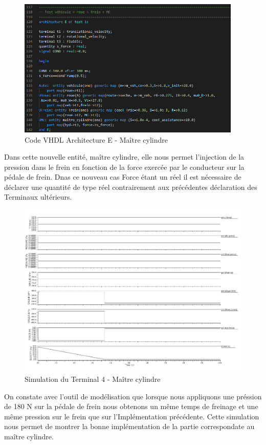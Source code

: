 \begin{figure}[h]
    \centering
    \includegraphics[width=0.95\textwidth]{images/MC.png}
    \caption{Code VHDL Architecture E - Maître cylindre}
\end{figure}
Dans cette nouvelle entité, maître cylindre, elle nous permet l'injection de la pression dans le frein en fonction de la force exercée par le conducteur sur la pédale de frein. Dnas ce nouveau cas Force étant un réel il est nécessaire de déclarer une quantité de type réel contrairement aux précédentes déclaration des Terminaux ultérieurs.
\newpage
\begin{figure}[h]
    \centering
    \includegraphics[width=\textwidth]{images/Instanciation_vehicule_roue_frein_Mc.jpg}
    \caption{Simulation du Terminal 4 - Maître cylindre}
\end{figure}
On constate avec l'outil de modélisation que lorsque nous appliquons une préssion de 180 N sur la pédale de frein nous obtenons un même temps de freinage et une même pression sur le frein que sur l'Implémentation précédente. Cette simulation nous permet de montrer la bonne implémentation de la partie correspondate au maître cylindre.

